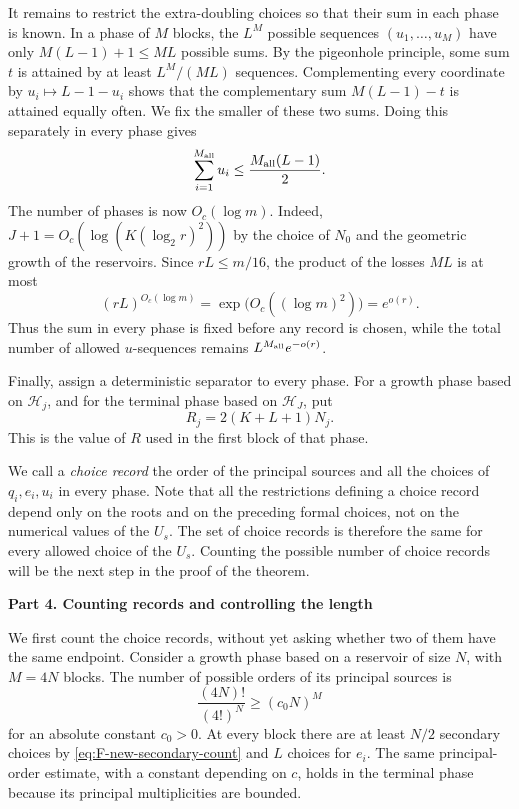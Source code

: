 \documentclass{article}
\theoremstyle{definition}
\begin{document}
It remains to restrict the extra-doubling choices so that their sum in each
phase is known.  In a phase of $M$ blocks, the $L^M$ possible sequences
$(u_1,\ldots,u_M)$ have only $M(L-1)+1\leq ML$ possible sums.  By the
pigeonhole principle, some sum $t$ is attained by at least $L^M/(ML)$
sequences.  Complementing every coordinate by $u_i\mapsto L-1-u_i$ shows
that the complementary sum $M(L-1)-t$ is attained equally often.  We fix the
smaller of these two sums.  Doing this separately in every phase gives
\begin{equation}
 \sum_{i=1}^{M_{\rm all}}u_i
 \leq\frac{M_{\rm all}(L-1)}2.
 \label{eq:F-new-u-budget}
\end{equation}
The number of phases is now $O_c(\log m)$. Indeed,
$J+1=O_c(\log(K(\log_2r)^2))$ by the choice of $N_0$
and the geometric growth of the reservoirs.
Since $rL\le m/16$, the product of the losses $ML$ is at most
$$
(rL)^{O_c(\log m)}
=\exp\big(O_c((\log m)^2)\big)
=e^{o(r)}.
$$
Thus the sum in every phase is fixed before any record is chosen, while the
total number of allowed $u$-sequences remains
$L^{M_{\rm all}}e^{-o(r)}$.

Finally, assign a deterministic separator to every phase.  For a growth phase
based on $\mathcal H_j$, and for the terminal phase based on $\mathcal H_J$,
put
\begin{equation}
 R_j=2(K+L+1)N_j.
 \label{eq:F-new-separators}
\end{equation}
This is the value of $R$ used in the first block of that phase.

We call a \emph{choice record} the order of the principal sources and all
the choices of $q_i,e_i,u_i$ in every phase.  Note that all the restrictions defining a
choice record depend only on the roots and on the preceding formal choices,
not on the numerical values of the $U_s$. The set of choice records is therefore the same for every allowed choice of the $U_s$. Counting the possible number of choice records will be the next step in the proof of the theorem. 


\vskip 10pt

\noindent
{\bf Part 4. Counting records and controlling the length}

We first count the choice records, without yet asking whether two of them have the same endpoint.  
Consider a growth phase based on a reservoir of size $N$, with $M=4N$
blocks.  The number of possible orders of its principal sources is
$$
 \frac{(4N)!}{(4!)^N}\geq(c_0N)^M
$$
for an absolute constant $c_0>0$.  At every block there are at least $N/2$
secondary choices by \eqref{eq:F-new-secondary-count} and $L$ choices for
$e_i$.  The same principal-order estimate, with a constant depending on $c$,
holds in the terminal phase because its principal multiplicities are bounded.
\end{document}
